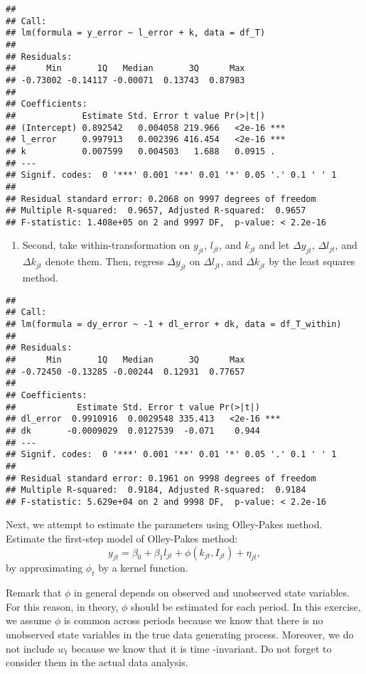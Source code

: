 \documentclass[
]{book}
\providecommand{\tightlist}{%
  \setlength{\itemsep}{0pt}\setlength{\parskip}{0pt}}
\begin{document}
\begin{verbatim}
## 
## Call:
## lm(formula = y_error ~ l_error + k, data = df_T)
## 
## Residuals:
##      Min       1Q   Median       3Q      Max 
## -0.73002 -0.14117 -0.00071  0.13743  0.87983 
## 
## Coefficients:
##             Estimate Std. Error t value Pr(>|t|)    
## (Intercept) 0.892542   0.004058 219.966   <2e-16 ***
## l_error     0.997913   0.002396 416.454   <2e-16 ***
## k           0.007599   0.004503   1.688   0.0915 .  
## ---
## Signif. codes:  0 '***' 0.001 '**' 0.01 '*' 0.05 '.' 0.1 ' ' 1
## 
## Residual standard error: 0.2068 on 9997 degrees of freedom
## Multiple R-squared:  0.9657,	Adjusted R-squared:  0.9657 
## F-statistic: 1.408e+05 on 2 and 9997 DF,  p-value: < 2.2e-16
\end{verbatim}

\begin{enumerate}
\def\labelenumi{\arabic{enumi}.}
\setcounter{enumi}{1}
\tightlist
\item
  Second, take within-transformation on \(y_{jt}\), \(l_{jt}\), and \(k_{jt}\) and let \(\Delta y_{jt}\), \(\Delta l_{jt}\), and \(\Delta k_{jt}\) denote them. Then, regress \(\Delta y_{jt}\) on \(\Delta l_{jt}\), and \(\Delta k_{jt}\) by the least squares method.
\end{enumerate}

\begin{verbatim}
## 
## Call:
## lm(formula = dy_error ~ -1 + dl_error + dk, data = df_T_within)
## 
## Residuals:
##      Min       1Q   Median       3Q      Max 
## -0.72450 -0.13285 -0.00244  0.12931  0.77657 
## 
## Coefficients:
##            Estimate Std. Error t value Pr(>|t|)    
## dl_error  0.9910916  0.0029548 335.413   <2e-16 ***
## dk       -0.0009029  0.0127539  -0.071    0.944    
## ---
## Signif. codes:  0 '***' 0.001 '**' 0.01 '*' 0.05 '.' 0.1 ' ' 1
## 
## Residual standard error: 0.1961 on 9998 degrees of freedom
## Multiple R-squared:  0.9184,	Adjusted R-squared:  0.9184 
## F-statistic: 5.629e+04 on 2 and 9998 DF,  p-value: < 2.2e-16
\end{verbatim}

Next, we attempt to estimate the parameters using Olley-Pakes method. Estimate the first-step model of Olley-Pakes method:
\[
y_{jt} = \beta_0 + \beta_1 l_{jt} + \phi(k_{jt}, I_{jt}) + \eta_{jt},
\]
by approximating \(\phi_t\) by a kernel function.

Remark that \(\phi\) in general depends on observed and unobserved state variables. For this reason, in theory, \(\phi\) should be estimated for each period. In this exercise, we assume \(\phi\) is common across periods because we know that there is no unobserved state variables in the true data generating process. Moreover, we do not include \(w_t\) because we know that it is time -invariant. Do not forget to consider them in the actual data analysis.
\end{document}
